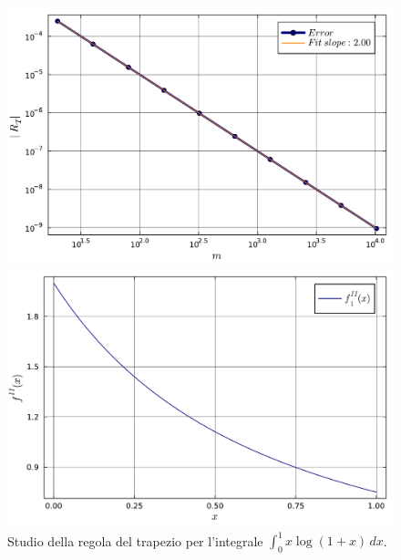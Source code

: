 \documentclass[letterpaper, 12pt]{article}
\numberwithin{equation}{section}    %
\begin{document}
\begin{figure}[!ht]
    \centering
    \begin{minipage}[b]{0.47\textwidth}
        \includegraphics[width=\textwidth]{5121.pdf}
    \end{minipage}
    \hspace{0.5cm}
    \begin{minipage}[b]{0.47\textwidth}
        \includegraphics[width=\textwidth]{5121_2.pdf}
    \end{minipage}
    \caption{Studio della regola del trapezio per l'integrale $\int_0^1 x\log(1+x)\, dx$.}
    \label{fig:es5_1_2_1}
\end{figure}
\end{document}
